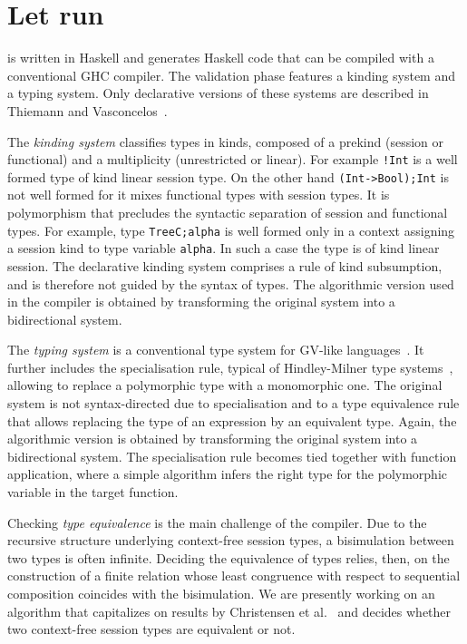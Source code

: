 \section{Let \freest{} run}
\label{sec:compiler}

\freest{} is written in Haskell and generates Haskell code that can be
compiled with a conventional GHC compiler.
%
The validation phase features a kinding system and a typing
system. Only declarative versions of these systems are described in
Thiemann and Vasconcelos~\cite{DBLP:conf/icfp/ThiemannV16}.

The \emph{kinding system} classifies types in kinds, composed of a
prekind (session or functional) and a multiplicity (unrestricted or
linear). For example \lstinline|!Int| is a well formed type of kind
linear session type. On the other hand \lstinline|(Int->Bool);Int| is
not well formed for it mixes functional types with session types.
%
It is polymorphism that precludes the syntactic separation of session
and functional types. For example, type \lstinline|TreeC;alpha| is
well formed only in a context assigning a session kind to type
variable \lstinline|alpha|. In such a case the type is of kind linear
session.
%
The declarative kinding system comprises a rule of kind subsumption,
and is therefore not guided by the syntax of types. The algorithmic
version used in the compiler is obtained by transforming the original
system into a bidirectional system.

The \emph{typing system} is a conventional type system for GV-like
languages~\cite{DBLP:journals/jfp/GayV10}. It further includes the
specialisation rule, typical of Hindley-Milner type
systems~\cite{DBLP:journals/jcss/Milner78}, allowing to replace a
polymorphic type with a monomorphic one. The original system is not
syntax-directed due to specialisation and to a type equivalence rule
that allows replacing the type of an expression by an equivalent
type.
%
Again, the algorithmic version is obtained by transforming the
original system into a bidirectional system. The specialisation rule
becomes tied together with function application, where a simple
algorithm infers the right type for the polymorphic variable in the
target function.

Checking \emph{type equivalence} is the main challenge of the
compiler. Due to the recursive structure underlying context-free 
session types, a bisimulation between two types is often infinite. 
Deciding the equivalence of types relies, then, on the construction 
of a finite relation whose least congruence with respect to  
sequential composition coincides with the bisimulation. We are 
presently working on an algorithm that capitalizes on results by 
Christensen et al.~\cite{DBLP:journals/iandc/ChristensenHS95} and 
decides whether two context-free session types are equivalent or not.  

